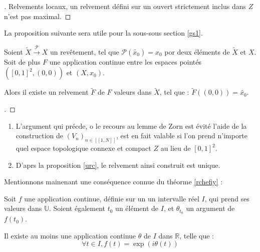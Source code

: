 \begin{proof}[\es]
Relvements locaux, un relvement d\'efini sur un ouvert strictement inclus dans $Z$ n'est pas maximal.
\end{proof}


La proposition suivante sera utile pour la sous-sous section \ref{gs1}.%

\begin{prop}\label{red2}
Soient $\tilde{X}\overset{\mathcal{P}}{\longrightarrow} X$ un rev\^etement, tel que $\mathcal{P}(\tilde{x_0})=x_0$ por deux \'el\'ements de $\tilde{X}$ et $X$. %
Soit de plus $F$ une application continue entre les espaces point\'es $([0,1]^2,(0,0))$ et $(X,x_0)$.

\par
Alors il existe un relvement $\tilde{F}$ de $F$  valeurs dans $\tilde{X}$, tel que : $\tilde{F}((0,0))=\tilde{x_0}$.
\end{prop}

\begin{proof}[\re]
\end{proof}

\begin{rema}
\begin{enumerate}
\item L'argument qui pr\'ecde, o le recours au lemme de Zorn est \'evit\'e  l'aide de la construction de $(V_n)_{n\in [\![1,N]\!]}$, %
est en fait valable si l'on prend n'importe quel espace topologique connexe et compact $Z$ au lieu de $[0,1]^2$.
\item D'aprs la proposition \ref{urc}, le relvement ainsi construit est unique.
\end{enumerate}
\end{rema}

\bigskip
Mentionnons mainenant une cons\'equence connue %
du th\'eorme \ref{rchefiy} :

\begin{prop}
Soit $f$ une application continue, d\'efinie sur un un intervalle r\'eel $I$, qui prend ses valeurs dans $\mathbb{U}$. %
Soient \'egalement $t_0$ un \'el\'ement de $I$, et $\theta_{t_0}$ un argument de $f(t_0)$.

\par
Il existe au moins une application continue $\theta$ de $I$ dans $\mathbb{R}$, telle que :
\[\forall t \in I, f(t)=\exp (i\theta (t))\]
\end{prop}

